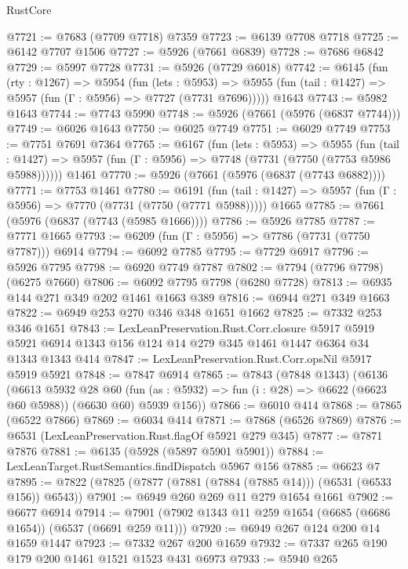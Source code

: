 \begin{lexlean}{RustCore}
\begin{coremodule}
@7721 := @7683 (@7709 @7718) @7359
@7723 := @6139 @7708 @7718
@7725 := @6142 @7707 @1506
@7727 := @5926 (@7661 @6839)
@7728 := @7686 @6842
@7729 := @5997 @7728
@7731 := @5926 (@7729 @6018)
@7742 := @6145
    (fun (rty : @1267) =>
    @5954
      (fun (lets : @5953) =>
      @5955 (fun (tail : @1427) => @5957 (fun (Γ : @5956) => @7727 (@7731 @7696)))))
    @1643
@7743 := @5982 @1643
@7744 := @7743 @5990
@7748 := @5926 (@7661 (@5976 (@6837 @7744)))
@7749 := @6026 @1643
@7750 := @6025 @7749
@7751 := @6029 @7749
@7753 := @7751 @7691 @7364
@7765 := @6167
    (fun (lets : @5953) =>
    @5955
      (fun (tail : @1427) => @5957 (fun (Γ : @5956) => @7748 (@7731 (@7750 (@7753 @5986 @5988))))))
    @1461
@7770 := @5926 (@7661 (@5976 (@6837 (@7743 @6882))))
@7771 := @7753 @1461
@7780 := @6191
    (fun (tail : @1427) => @5957 (fun (Γ : @5956) => @7770 (@7731 (@7750 (@7771 @5988)))))
    @1665
@7785 := @7661 (@5976 (@6837 (@7743 (@5985 @1666))))
@7786 := @5926 @7785
@7787 := @7771 @1665
@7793 := @6209 (fun (Γ : @5956) => @7786 (@7731 (@7750 @7787))) @6914
@7794 := @6092 @7785
@7795 := @7729 @6917
@7796 := @5926 @7795
@7798 := @6920 @7749 @7787
@7802 := @7794 (@7796 @7798) (@6275 @7660)
@7806 := @6092 @7795 @7798 (@6280 @7728)
@7813 := @6935 @144 @271 @349 @202 @1461 @1663 @389
@7816 := @6944 @271 @349 @1663
@7822 := @6949 @253 @270 @346 @348 @1651 @1662
@7825 := @7332 @253 @346 @1651
@7843 := LexLeanPreservation.Rust.Corr.closure
    @5917
    @5919
    @5921
    @6914
    @1343
    @156
    @124
    @14
    @279
    @345
    @1461
    @1447
    @6364
    @34
    @1343
    @1343
    @414
@7847 := LexLeanPreservation.Rust.Corr.opsNil @5917 @5919 @5921
@7848 := @7847 @6914
@7865 := @7843
    (@7848 @1343)
    (@6136
      (@6613
        @5932
        @28
        @60
        (fun (as : @5932) => fun (i : @28) => @6622 (@6623 @60 @5988))
        (@6630 @60)
        @5939
        @156))
@7866 := @6010 @414
@7868 := @7865 (@6522 @7866)
@7869 := @6034 @414
@7871 := @7868 (@6526 @7869)
@7876 := @6531 (LexLeanPreservation.Rust.flagOf @5921 @279 @345)
@7877 := @7871 @7876
@7881 := @6135 (@5928 (@5897 @5901 @5901))
@7884 := LexLeanTarget.RustSemantics.findDispatch @5967 @156
@7885 := @6623 @7
@7895 := @7822 (@7825 (@7877 (@7881 (@7884 (@7885 @14))) (@6531 (@6533 @156)) @6543))
@7901 := @6949 @260 @269 @11 @279 @1654 @1661
@7902 := @6677 @6914
@7914 := @7901 (@7902 @1343 @11 @259 @1654 (@6685 (@6686 @1654)) (@6537 (@6691 @259 @11)))
@7920 := @6949 @267 @124 @200 @14 @1659 @1447
@7923 := @7332 @267 @200 @1659
@7932 := @7337 @265 @190 @179 @200 @1461 @1521 @1523 @431 @6973
@7933 := @5940 @265

\end{coremodule}
\end{lexlean}
